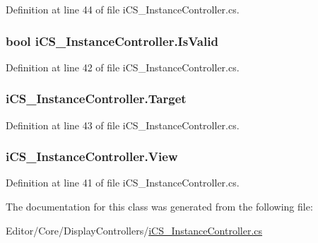 Definition at line 44 of file i\+C\+S\+\_\+\+Instance\+Controller.\+cs.

\hypertarget{classi_c_s___instance_controller_a9915e7b83716cdc93bba642845be21bd}{
\subsubsection[{Is\+Valid}]{\setlength{\rightskip}{0pt plus 5cm}bool i\+C\+S\+\_\+\+Instance\+Controller.\+Is\+Valid\hspace{0.3cm}{\ttfamily [get]}}}\label{classi_c_s___instance_controller_a9915e7b83716cdc93bba642845be21bd}


Definition at line 42 of file i\+C\+S\+\_\+\+Instance\+Controller.\+cs.

\hypertarget{classi_c_s___instance_controller_ac083a60a56887ab688cf415b1398e9f4}{
\subsubsection[{Target}]{ i\+C\+S\+\_\+\+Instance\+Controller.\+Target\hspace{0.3cm}{\ttfamily [get]}}}\label{classi_c_s___instance_controller_ac083a60a56887ab688cf415b1398e9f4}


Definition at line 43 of file i\+C\+S\+\_\+\+Instance\+Controller.\+cs.

\hypertarget{classi_c_s___instance_controller_a182468db5fa543b932f842f89338a1ab}{
\subsubsection[{View}]{ i\+C\+S\+\_\+\+Instance\+Controller.\+View\hspace{0.3cm}{\ttfamily [get]}}}\label{classi_c_s___instance_controller_a182468db5fa543b932f842f89338a1ab}


Definition at line 41 of file i\+C\+S\+\_\+\+Instance\+Controller.\+cs.



The documentation for this class was generated from the following file\+:\begin{DoxyCompactItemize}
\item 
Editor/\+Core/\+Display\+Controllers/\hyperlink{i_c_s___instance_controller_8cs}{i\+C\+S\+\_\+\+Instance\+Controller.\+cs}\end{DoxyCompactItemize}
